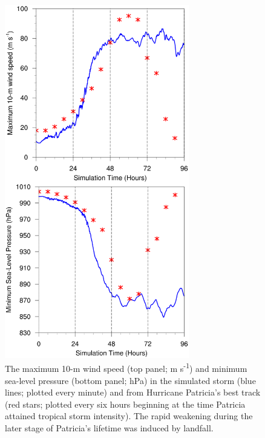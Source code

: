 \documentclass{ametsoc}
\begin{document}
\begin{figure}[ht]
\centerline{\includegraphics[width=19pc]{vmax+pmin.png}}
\caption{The maximum 10-m wind speed (top panel; m s\textsuperscript{-1}) and minimum sea-level pressure (bottom panel; hPa) in the simulated storm (blue lines; plotted every minute) and from Hurricane Patricia's best track (red stars; plotted every six hours beginning at the time Patricia attained tropical storm intensity). The rapid weakening during the later stage of Patricia's lifetime was induced by landfall.}
\label{fig:vmax+pmin}
\end{figure}
\end{document}
